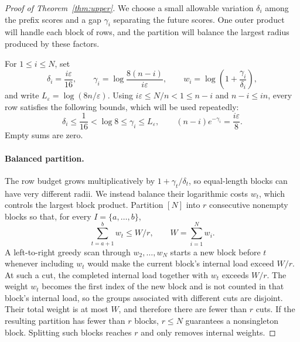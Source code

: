 \documentclass[10pt]{article} %
\theoremstyle{definition}
\begin{document}
\begin{proof}[Proof of Theorem~\ref{thm:upper}]
We choose a small allowable variation \(\delta_i\) among the prefix scores
and a gap \(\gamma_i\) separating the future scores.  One outer product will
handle each block of rows, and the partition will balance the largest radius
produced by these factors.

For \(1\le i\le N\), set
\[
 \delta_i=\frac{i\varepsilon}{16},\qquad
 \gamma_i=\log\frac{8(n-i)}{i\varepsilon},\qquad
 w_i=\log\left(1+\frac{\gamma_i}{\delta_i}\right),
\]
and write \(L_\varepsilon=\log(8n/\varepsilon)\).  Using
\(i\varepsilon\le N/n<1\le n-i\) and \(n-i\le in\), every row satisfies the
following bounds, which will be used repeatedly:
\begin{equation}\label{eq:margins}
 \delta_i\le\frac1{16}<\log8\le\gamma_i\le L_\varepsilon,
 \qquad
 (n-i)e^{-\gamma_i}=\frac{i\varepsilon}8 .
\end{equation}
Empty sums are zero.

\paragraph{Balanced partition.}
The row budget grows multiplicatively by
\(1+\gamma_t/\delta_t\), so equal-length blocks can have very different
radii.  We instead balance their logarithmic costs \(w_t\), which controls
the largest block product.
Partition \([N]\) into \(r\) consecutive
nonempty blocks so that, for every \(I=\{a,\ldots,b\}\),
\[
 \sum_{t=a+1}^{b}w_t\le W/r,\qquad W=\sum_{i=1}^Nw_i.
\]
A left-to-right greedy scan through \(w_2,\ldots,w_N\) starts a new block
before \(t\) whenever including \(w_t\) would make the current block's
internal load exceed \(W/r\).  At such a cut, the completed internal load
together with \(w_t\) exceeds \(W/r\).  The weight \(w_t\) becomes the first
index of the new block and is not counted in that block's internal load, so
the groups associated with different cuts are disjoint.  Their total weight
is at most \(W\), and therefore there are fewer than \(r\) cuts.
If the resulting partition has fewer than
\(r\) blocks, \(r\le N\) guarantees a nonsingleton block.  Splitting such
blocks reaches \(r\) and only removes internal weights.


\end{proof}
\end{document}
